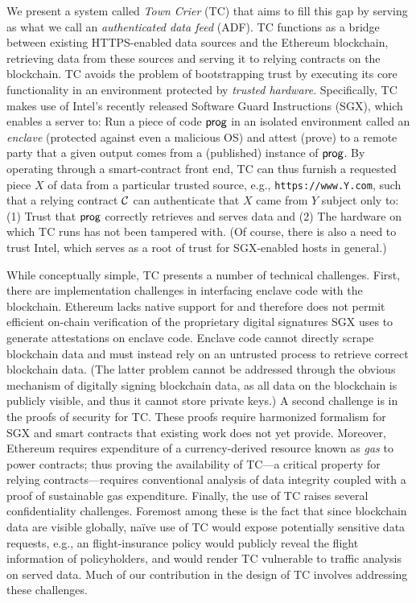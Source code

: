 We present a system called \emph{Town Crier} (TC) that aims to fill this gap by serving as what we call an \emph{authenticated data feed} (ADF). TC functions as a bridge between existing HTTPS-enabled data sources and the Ethereum blockchain, retrieving data from these sources and serving it to relying contracts on the blockchain. TC avoids the problem of bootstrapping trust by executing its core functionality in an environment protected by \emph{trusted hardware}. Specifically, TC makes use of Intel's recently released Software Guard Instructions (SGX), which enables a server to: Run a piece of code ${\sf prog}$ in an isolated environment called an \emph{enclave} (protected against even a malicious OS) and attest (prove) to a remote party that a given output comes from a (published) instance of ${\sf prog}$. By operating through a smart-contract front end, TC can thus furnish a requested piece $X$ of data from a particular trusted source, e.g., \texttt{https://www.Y.com}, such that a relying contract ${\cal C}$ can authenticate that $X$ came from $Y$ subject only to: (1) Trust that ${\sf prog}$ correctly retrieves and serves data and (2) The hardware on which TC runs has not been tampered with. (Of course, there is also a need to trust Intel, which serves as a root of trust for SGX-enabled hosts in general.)

While conceptually simple, TC presents a number of technical challenges. First, there are implementation challenges in interfacing enclave code with the blockchain. Ethereum lacks native support for and therefore does not permit efficient on-chain verification of the proprietary digital signatures SGX uses to generate attestations on enclave code. Enclave code cannot directly scrape blockchain data and must instead rely on an untrusted process to retrieve correct blockchain data. (The latter problem cannot be addressed through the obvious mechanism of digitally signing blockchain data, as all data on the blockchain is publicly visible, and thus it cannot store private keys.) A second challenge is in the proofs of security for TC. These proofs require harmonized formalism for SGX and smart contracts that existing work does not yet provide. Moreover, Ethereum requires expenditure of a currency-derived resource known as \emph{gas} to power contracts; thus proving the availability of TC---a critical property for relying contracts---requires conventional analysis of data integrity coupled with a proof of sustainable gas expenditure. Finally, the use of TC raises several confidentiality challenges. Foremost among these is the fact that since blockchain data are visible globally, na\"{i}ve use of TC would expose potentially sensitive data requests, e.g., an flight-insurance policy would publicly reveal the flight information of policyholders, and would render TC vulnerable to traffic analysis on served data. Much of our contribution in the design of TC involves addressing these challenges. 

